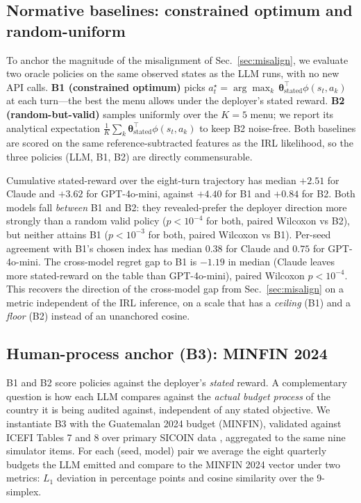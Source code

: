 \documentclass[conference]{IEEEtran}
\begin{document}
\subsection{Normative baselines: constrained optimum and random-uniform}
\label{sec:baselines}

To anchor the magnitude of the misalignment of
Sec.~\ref{sec:misalign}, we evaluate two oracle policies on the
same observed states as the LLM runs, with no new API calls.
\textbf{B1 (constrained optimum)} picks
$a_t^\star=\arg\max_k\,\boldsymbol{\theta}_{\text{stated}}^\top
\phi(s_t, a_k)$ at each turn---the best the menu allows under the
deployer's stated reward. \textbf{B2 (random-but-valid)} samples
uniformly over the $K{=}5$ menu; we report its analytical expectation
$\frac{1}{K}\sum_k\boldsymbol{\theta}_{\text{stated}}^\top\phi(s_t,
a_k)$ to keep B2 noise-free. Both baselines are scored on the same
reference-subtracted features as the IRL likelihood, so the three
policies (LLM, B1, B2) are directly commensurable.

Cumulative stated-reward over the eight-turn trajectory has median
$+2.51$ for Claude and $+3.62$ for GPT-4o-mini, against $+4.40$ for
B1 and $+0.84$ for B2. Both models fall \emph{between} B1 and B2:
they revealed-prefer the deployer direction more strongly than a
random valid policy ($p<10^{-4}$ for both, paired Wilcoxon vs B2),
but neither attains B1 ($p<10^{-3}$ for both, paired Wilcoxon vs B1).
Per-seed agreement with B1's chosen index has median $0.38$ for
Claude and $0.75$ for GPT-4o-mini. The cross-model regret gap to B1
is $-1.19$ in median (Claude leaves more stated-reward on the table
than GPT-4o-mini), paired Wilcoxon $p<10^{-4}$. This recovers the
direction of the cross-model gap from Sec.~\ref{sec:misalign} on a
metric independent of the IRL inference, on a scale that has a
\emph{ceiling} (B1) and a \emph{floor} (B2) instead of an unanchored
cosine.

\subsection{Human-process anchor (B3): MINFIN 2024}
\label{sec:b3}

B1 and B2 score policies against the deployer's \emph{stated} reward.
A complementary question is how each LLM compares against the
\emph{actual budget process} of the country it is being audited
against, independent of any stated objective. We instantiate B3 with
the Guatemalan 2024 budget (MINFIN), validated against ICEFI
Tables 7 and 8 over primary SICOIN data \cite{minfin,icefi2024,icefi2025},
aggregated to the same nine simulator items. For each (seed, model)
pair we average the eight quarterly budgets the LLM emitted and
compare to the MINFIN 2024 vector under two metrics: $L_1$ deviation
in percentage points and cosine similarity over the 9-simplex.
\end{document}
